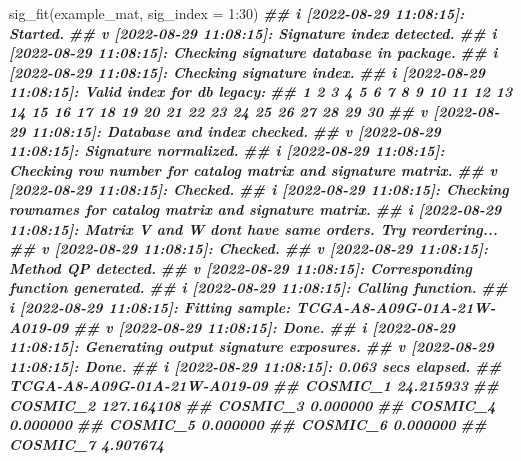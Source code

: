 \documentclass[
  12pt,
  a4paper,
  twoside]{book}
\newenvironment{Shaded}{\begin{snugshade}}{\end{snugshade}}
\newcommand{\AttributeTok}[1]{\textcolor[rgb]{0.77,0.63,0.00}{#1}}
\newcommand{\DecValTok}[1]{\textcolor[rgb]{0.00,0.00,0.81}{#1}}
\newcommand{\DocumentationTok}[1]{\textcolor[rgb]{0.56,0.35,0.01}{\textbf{\textit{#1}}}}
\newcommand{\FunctionTok}[1]{\textcolor[rgb]{0.00,0.00,0.00}{#1}}
\newcommand{\NormalTok}[1]{#1}
\newcommand{\SpecialCharTok}[1]{\textcolor[rgb]{0.00,0.00,0.00}{#1}}
\begin{document}
\begin{Shaded}
\begin{Highlighting}[]
\FunctionTok{sig\_fit}\NormalTok{(example\_mat, }\AttributeTok{sig\_index =} \DecValTok{1}\SpecialCharTok{:}\DecValTok{30}\NormalTok{)}
\DocumentationTok{\#\# i [2022{-}08{-}29 11:08:15]: Started.}
\DocumentationTok{\#\# v [2022{-}08{-}29 11:08:15]: Signature index detected.}
\DocumentationTok{\#\# i [2022{-}08{-}29 11:08:15]: Checking signature database in package.}
\DocumentationTok{\#\# i [2022{-}08{-}29 11:08:15]: Checking signature index.}
\DocumentationTok{\#\# i [2022{-}08{-}29 11:08:15]: Valid index for db \textquotesingle{}legacy\textquotesingle{}:}
\DocumentationTok{\#\# 1 2 3 4 5 6 7 8 9 10 11 12 13 14 15 16 17 18 19 20 21 22 23 24 25 26 27 28 29 30}
\DocumentationTok{\#\# v [2022{-}08{-}29 11:08:15]: Database and index checked.}
\DocumentationTok{\#\# v [2022{-}08{-}29 11:08:15]: Signature normalized.}
\DocumentationTok{\#\# i [2022{-}08{-}29 11:08:15]: Checking row number for catalog matrix and signature matrix.}
\DocumentationTok{\#\# v [2022{-}08{-}29 11:08:15]: Checked.}
\DocumentationTok{\#\# i [2022{-}08{-}29 11:08:15]: Checking rownames for catalog matrix and signature matrix.}
\DocumentationTok{\#\# i [2022{-}08{-}29 11:08:15]: Matrix V and W don\textquotesingle{}t have same orders. Try reordering...}
\DocumentationTok{\#\# v [2022{-}08{-}29 11:08:15]: Checked.}
\DocumentationTok{\#\# v [2022{-}08{-}29 11:08:15]: Method \textquotesingle{}QP\textquotesingle{} detected.}
\DocumentationTok{\#\# v [2022{-}08{-}29 11:08:15]: Corresponding function generated.}
\DocumentationTok{\#\# i [2022{-}08{-}29 11:08:15]: Calling function.}
\DocumentationTok{\#\# i [2022{-}08{-}29 11:08:15]: Fitting sample: TCGA{-}A8{-}A09G{-}01A{-}21W{-}A019{-}09}
\DocumentationTok{\#\# v [2022{-}08{-}29 11:08:15]: Done.}
\DocumentationTok{\#\# i [2022{-}08{-}29 11:08:15]: Generating output signature exposures.}
\DocumentationTok{\#\# v [2022{-}08{-}29 11:08:15]: Done.}
\DocumentationTok{\#\# i [2022{-}08{-}29 11:08:15]: 0.063 secs elapsed.}
\DocumentationTok{\#\#           TCGA{-}A8{-}A09G{-}01A{-}21W{-}A019{-}09}
\DocumentationTok{\#\# COSMIC\_1                     24.215933}
\DocumentationTok{\#\# COSMIC\_2                    127.164108}
\DocumentationTok{\#\# COSMIC\_3                      0.000000}
\DocumentationTok{\#\# COSMIC\_4                      0.000000}
\DocumentationTok{\#\# COSMIC\_5                      0.000000}
\DocumentationTok{\#\# COSMIC\_6                      0.000000}
\DocumentationTok{\#\# COSMIC\_7                      4.907674}

\end{Highlighting}
\end{Shaded}
\end{document}
